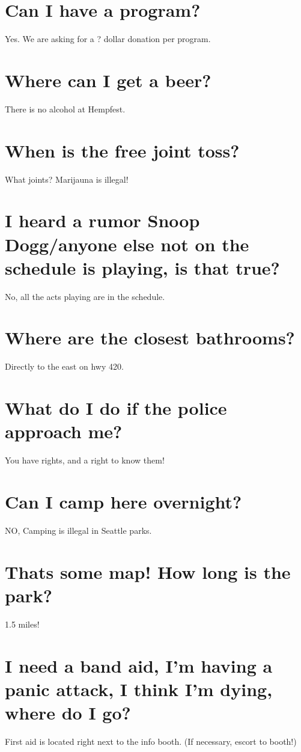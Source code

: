 \section{Can I have a program?}
Yes. We are asking for a ? dollar donation per program. 

\section{Where can I get a beer?}
There is no alcohol at Hempfest. 

\section{When is the free joint toss?}
What joints? Marijauna is illegal! 

\section{I heard a rumor Snoop Dogg/anyone else not on the schedule is playing, is that true?}
No, all the acts playing are in the schedule.

\section{Where are the closest bathrooms?}
Directly to the east on hwy 420.

\section{What do I do if the police approach me?}
You have rights, and a right to know them!
 
\section{Can I camp here overnight?}
NO, Camping is illegal in Seattle parks.

\section{Thats some map! How long is the park?}
1.5 miles! 

\section{I need a band aid, I'm having a panic attack, I think I'm dying, where do I go?}
First aid is located right next to the info booth. (If necessary, escort to booth!)









